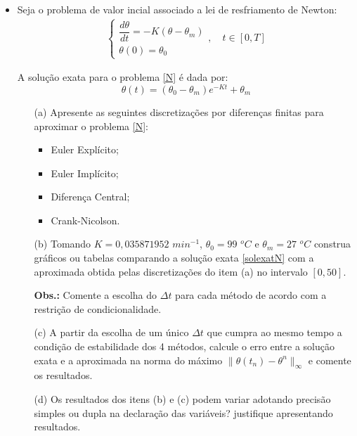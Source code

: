 \documentclass{article}
\newcounter{execs}
\newcommand{\exec}[0]{\addtocounter{execs}{1}\item[\textbf{\arabic{execs}.}]}
\begin{document}
\thispagestyle{first}

\begin{itemize}

\exec Seja o problema de valor incial associado a lei de resfriamento de Newton:
\begin{eqnarray} \label{N}
\begin{cases}
 \dfrac{d \theta}{d t} = -K(\theta - \theta_m)\\ 
\theta(0) = \theta_0
\end{cases}, 
\quad t\in [0,T]
\end{eqnarray}

A solução exata para o problema \eqref{N} é dada por:
\begin{equation}\label{solexatN}
\theta(t) = (\theta_0 - \theta_m) e^{-Kt} + \theta_m
\end{equation}

\begin{itemize}
 \item[(a)] Apresente as seguintes discretizações por diferenças finitas para aproximar o problema \eqref{N}:
\begin{itemize}
\item Euler Explícito;
\item Euler Implícito;
\item Diferença Central;
\item Crank-Nicolson.
\end{itemize} 
 \item[(b)] Tomando $K=0,035871952$ $min^{-1}$, $\theta_0=99$ $^oC$ e $\theta_m=27$ $^oC$ construa gráficos ou tabelas comparando a solução exata \eqref{solexatN} com a aproximada obtida pelas discretizações do item (a) no intervalo $[0,50]$.
 
\textbf{Obs.:} Comente a escolha do $\Delta t$ para cada método de acordo com a restrição de condicionalidade.
 
 \item[(c)] A partir da escolha de um único $\Delta t$ que cumpra ao mesmo tempo a condição de estabilidade dos 4 métodos, calcule o erro entre a solução exata e a aproximada na norma do máximo $\|\theta(t_n) - \theta^n\|_{\infty}$ e comente os resultados.
 
 \item[(d)] Os resultados dos itens (b) e (c) podem variar adotando precisão simples ou dupla na declaração das variáveis? justifique apresentando resultados. 
\end{itemize} 



\end{itemize}
\end{document}
